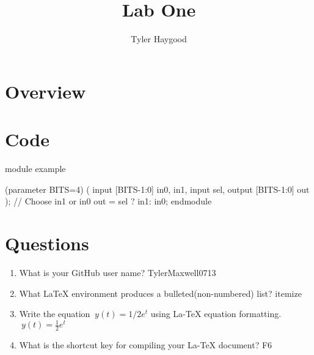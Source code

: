 \documentclass[]{report}
\begin{document}
\title{Lab One}
\author{Tyler Haygood}
\maketitle

\section{Overview}

\section*{}

\section{Code}

module example
 \newline

(parameter BITS=4) 
(				   \newline
	input [BITS-1:0] in0, in1, \newline
	input sel,                 \newline
	output [BITS-1:0] out      \newline
);                         \newline
// Choose in1 or in0       \newline
out = sel ? in1: in0;      \newline
	 \newline
endmodule                     

\section*{}

\section{Questions}

\begin{enumerate}
	\item What is your GitHub user name? \newline
	TylerMaxwell0713 \newline
	\item What LaTeX environment produces a bulleted(non-numbered) list? \newline
	itemize \newline
	\item Write the equation $\ y(t) = 1/2 e^t $ using La-TeX equation formatting. \newline
	$\ y(t) = \frac{1}{2} e^t $ \newline
	\item What is the shortcut key for compiling your La-TeX document? \newline
	F6 \newline
\end{enumerate}

\section*{}
\end{document}
